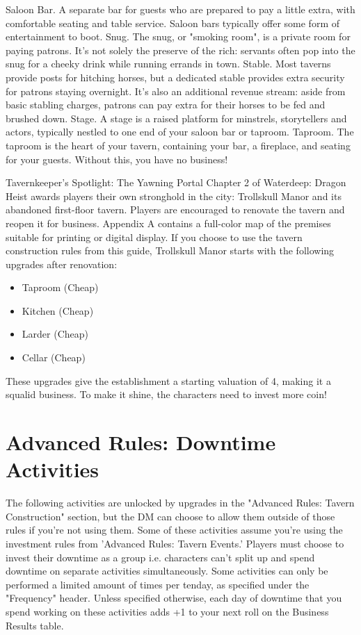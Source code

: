 \documentclass[10pt,a4paper,twoside,twocolumn,openany,bg=print,nodeprecatedcode]{dndbook}
\begin{document}
Saloon Bar. A separate bar for guests who are prepared to pay a little extra, with comfortable seating and table service. Saloon bars typically offer some form of entertainment to boot.
Snug. The snug, or "smoking room", is a private room for paying patrons. It's not solely the preserve of the rich: servants often pop into the snug for a cheeky drink while running errands in town.
Stable. Most taverns provide posts for hitching horses, but a dedicated stable provides extra security for patrons staying overnight. It's also an additional revenue stream: aside from basic stabling charges, patrons can pay extra for their horses to be fed and brushed down.
Stage. A stage is a raised platform for minstrels, storytellers and actors, typically nestled to one end of your saloon bar or taproom.
Taproom. The taproom is the heart of your tavern, containing your bar, a fireplace, and seating for your guests. Without this, you have no business!
\begin{DndComment}{Tavernkeeper's Spotlight: The Yawning Portal}
Chapter 2 of Waterdeep: Dragon Heist awards players their own stronghold in the city: Trollskull Manor and its abandoned first-floor tavern. Players are encouraged to renovate the tavern and reopen it for business.
Appendix A contains a full-color map of the premises suitable for printing or digital display. If you choose to use the tavern construction rules from this guide, Trollskull Manor starts with the following upgrades after renovation:

\begin{itemize}
\item Taproom (Cheap)
\item Kitchen (Cheap)
\item Larder (Cheap)
\item Cellar (Cheap)
\end{itemize}

These upgrades give the establishment a starting valuation of 4, making it a squalid business. To make it shine, the characters need to invest more coin!
\end{DndComment}

\section{Advanced Rules: Downtime Activities}
The following activities are unlocked by upgrades in the "Advanced Rules: Tavern Construction" section, but the DM can choose to allow them outside of those rules if you're not using them. Some of these activities assume you're using the investment rules from 'Advanced Rules: Tavern Events.'
Players must choose to invest their downtime as a group i.e. characters can't split up and spend downtime on separate activities simultaneously. Some activities can only be performed a limited amount of times per tenday, as specified under the "Frequency" header. Unless specified otherwise, each day of downtime that you spend working on these activities adds +1 to your next roll on the Business Results table.
\end{document}
